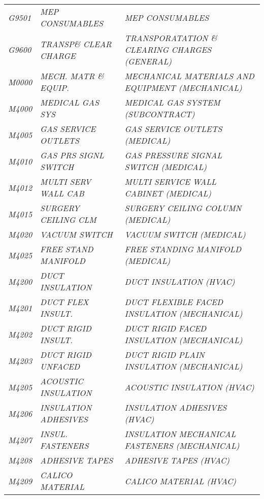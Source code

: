 \begin{landscape}
\begin{longtable}[l]{l%
                  l|%
                  l|}
\itshape G9501       &\itshape MEP CONSUMABLES   &\itshape MEP CONSUMABLES   \\
\itshape G9600       &\itshape TRANSP\& CLEAR CHARGE   &\itshape TRANSPORATATION \& CLEARING CHARGES (GENERAL)   \\
\itshape M0000       &\itshape MECH. MATR \& EQUIP.   &\itshape MECHANICAL MATERIALS AND EQUIPMENT (MECHANICAL)   \\
\itshape M4000       &\itshape MEDICAL GAS SYS   &\itshape MEDICAL GAS SYSTEM (SUBCONTRACT)   \\
\itshape M4005       &\itshape GAS SERVICE OUTLETS   &\itshape GAS SERVICE OUTLETS (MEDICAL)   \\
\itshape M4010       &\itshape GAS PRS SIGNL SWITCH   &\itshape GAS PRESSURE SIGNAL SWITCH (MEDICAL)   \\
\itshape M4012       &\itshape MULTI SERV WALL CAB   &\itshape MULTI SERVICE WALL CABINET (MEDICAL)   \\
\itshape M4015       &\itshape SURGERY CEILING CLM   &\itshape SURGERY CEILING COLUMN (MEDICAL)   \\
\itshape M4020       &\itshape VACUUM SWITCH   &\itshape VACUUM SWITCH (MEDICAL)   \\
\itshape M4025       &\itshape FREE STAND MANIFOLD   &\itshape FREE STANDING MANIFOLD (MEDICAL)   \\
\itshape M4200       &\itshape DUCT INSULATION   &\itshape DUCT INSULATION (HVAC)   \\
\itshape M4201       &\itshape DUCT FLEX INSULT.   &\itshape DUCT FLEXIBLE FACED INSULATION (MECHANICAL)   \\
\itshape M4202       &\itshape DUCT RIGID INSULT.   &\itshape DUCT RIGID FACED INSULATION (MECHANICAL)   \\
\itshape M4203       &\itshape DUCT RIGID UNFACED   &\itshape DUCT RIGID PLAIN INSULATION (MECHANICAL)   \\
\itshape M4205       &\itshape ACOUSTIC INSULATION   &\itshape ACOUSTIC INSULATION (HVAC)   \\
\itshape M4206       &\itshape INSULATION ADHESIVES   &\itshape INSULATION ADHESIVES (HVAC)   \\
\itshape M4207       &\itshape INSUL. FASTENERS   &\itshape INSULATION MECHANICAL FASTENERS (MECHANICAL)   \\
\itshape M4208       &\itshape ADHESIVE TAPES   &\itshape ADHESIVE TAPES (HVAC)   \\
\itshape M4209       &\itshape CALICO MATERIAL   &\itshape CALICO MATERIAL (HVAC)   \\

\end{longtable}
\end{landscape}
